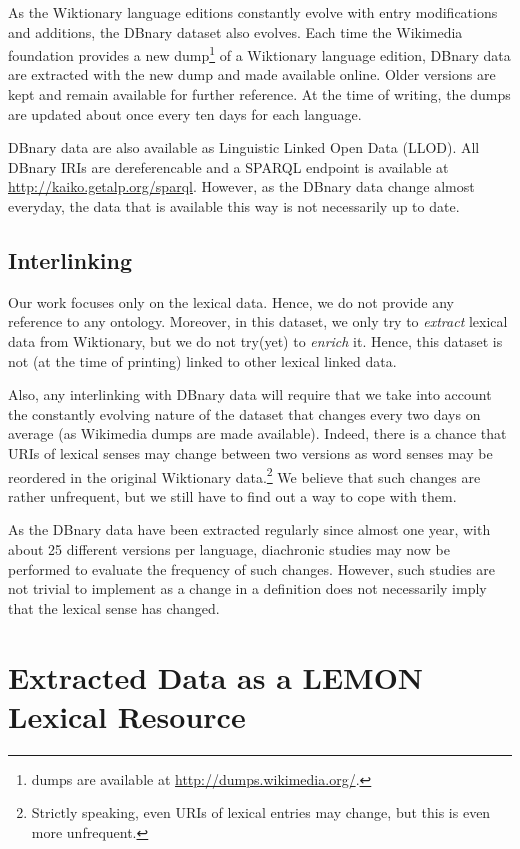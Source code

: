 \documentclass[sw]{iosart2c}
\begin{document}
As the Wiktionary language editions constantly evolve with entry modifications and additions, the DBnary dataset also evolves. Each time the Wikimedia foundation provides a new dump\footnote{dumps are available at \url{http://dumps.wikimedia.org/}.} of a Wiktionary language edition, DBnary data are extracted with the new dump and made available online. Older versions are kept and remain available for further reference. At the time of writing, the dumps are updated about once every ten days for each language. 

DBnary data are also available as Linguistic Linked Open Data (LLOD). All DBnary IRIs are dereferencable and a SPARQL endpoint is available at \url{http://kaiko.getalp.org/sparql}. However, as the DBnary data change almost everyday, the data that is available this way is not necessarily up to date.

\subsection{Interlinking}

Our work focuses only on the lexical data. Hence, we do not provide any reference to any ontology. Moreover, in this dataset, we only try to \emph{extract} lexical data from Wiktionary, but we do not try(yet) to \emph{enrich} it. Hence, this dataset is not (at the time of printing) linked to other lexical linked data. 

Also, any interlinking with DBnary data will require that we take into account the constantly evolving nature of the dataset that changes every two days on average (as Wikimedia dumps are made available). Indeed, there is a chance that URIs of lexical senses may change between two versions as word senses may be reordered in the original Wiktionary data.\footnote{Strictly speaking, even URIs of lexical entries may change, but this is even more unfrequent.} We believe that such changes are rather unfrequent, but we still have to find out a way to cope with them. 

As the DBnary data have been extracted regularly since almost one year, with about 25 different versions per language, diachronic studies may now be performed to evaluate the frequency of such changes. However, such studies are not trivial to implement as a change in a definition does not necessarily imply that the lexical sense has changed.

\section{Extracted Data as a LEMON Lexical Resource}
\end{document}
